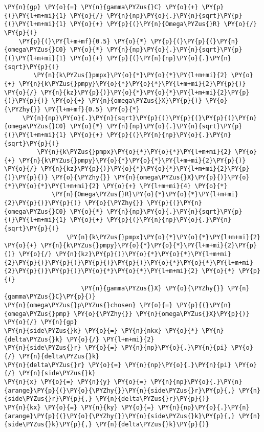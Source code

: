 \begin{Verbatim}[commandchars=\\\{\}]
\PY{n}{gp} \PY{o}{=} \PY{n}{gamma\PYZus{}C} \PY{o}{+} \PY{p}{(}\PY{l+m+mi}{1} \PY{o}{/} \PY{n}{np}\PY{o}{.}\PY{n}{sqrt}\PY{p}{(}\PY{l+m+mi}{1} \PY{o}{+} \PY{p}{(}\PY{n}{Omega\PYZus{}R} \PY{o}{/} \PY{p}{(}
    \PY{p}{(}\PY{l+m+mf}{0.5} \PY{o}{*} \PY{p}{(}\PY{p}{(}\PY{n}{omega\PYZus{}C0} \PY{o}{*} \PY{n}{np}\PY{o}{.}\PY{n}{sqrt}\PY{p}{(}\PY{l+m+mi}{1} \PY{o}{+} \PY{p}{(}\PY{n}{np}\PY{o}{.}\PY{n}{sqrt}\PY{p}{(}
        \PY{n}{k\PYZus{}pmpx}\PY{o}{*}\PY{o}{*}\PY{l+m+mi}{2} \PY{o}{+} \PY{n}{k\PYZus{}pmpy}\PY{o}{*}\PY{o}{*}\PY{l+m+mi}{2}\PY{p}{)} \PY{o}{/} \PY{n}{kz}\PY{p}{)}\PY{o}{*}\PY{o}{*}\PY{l+m+mi}{2}\PY{p}{)}\PY{p}{)} \PY{o}{+} \PY{n}{omega\PYZus{}X}\PY{p}{)} \PY{o}{\PYZhy{}} \PY{l+m+mf}{0.5} \PY{o}{*}
     \PY{n}{np}\PY{o}{.}\PY{n}{sqrt}\PY{p}{(}\PY{p}{(}\PY{p}{(}\PY{n}{omega\PYZus{}C0} \PY{o}{*} \PY{n}{np}\PY{o}{.}\PY{n}{sqrt}\PY{p}{(}\PY{l+m+mi}{1} \PY{o}{+} \PY{p}{(}\PY{n}{np}\PY{o}{.}\PY{n}{sqrt}\PY{p}{(}
         \PY{n}{k\PYZus{}pmpx}\PY{o}{*}\PY{o}{*}\PY{l+m+mi}{2} \PY{o}{+} \PY{n}{k\PYZus{}pmpy}\PY{o}{*}\PY{o}{*}\PY{l+m+mi}{2}\PY{p}{)} \PY{o}{/} \PY{n}{kz}\PY{p}{)}\PY{o}{*}\PY{o}{*}\PY{l+m+mi}{2}\PY{p}{)}\PY{p}{)} \PY{o}{\PYZhy{}} \PY{n}{omega\PYZus{}X}\PY{p}{)}\PY{o}{*}\PY{o}{*}\PY{l+m+mi}{2} \PY{o}{+} \PY{l+m+mi}{4} \PY{o}{*}
             \PY{n}{Omega\PYZus{}R}\PY{o}{*}\PY{o}{*}\PY{l+m+mi}{2}\PY{p}{)}\PY{p}{)} \PY{o}{\PYZhy{}} \PY{p}{(}\PY{n}{omega\PYZus{}C0} \PY{o}{*} \PY{n}{np}\PY{o}{.}\PY{n}{sqrt}\PY{p}{(}\PY{l+m+mi}{1} \PY{o}{+} \PY{p}{(}\PY{n}{np}\PY{o}{.}\PY{n}{sqrt}\PY{p}{(}
                 \PY{n}{k\PYZus{}pmpx}\PY{o}{*}\PY{o}{*}\PY{l+m+mi}{2} \PY{o}{+} \PY{n}{k\PYZus{}pmpy}\PY{o}{*}\PY{o}{*}\PY{l+m+mi}{2}\PY{p}{)} \PY{o}{/} \PY{n}{kz}\PY{p}{)}\PY{o}{*}\PY{o}{*}\PY{l+m+mi}{2}\PY{p}{)}\PY{p}{)}\PY{p}{)}\PY{p}{)}\PY{o}{*}\PY{o}{*}\PY{l+m+mi}{2}\PY{p}{)}\PY{p}{)}\PY{o}{*}\PY{o}{*}\PY{l+m+mi}{2} \PY{o}{*} \PY{p}{(}
                     \PY{n}{gamma\PYZus{}X} \PY{o}{\PYZhy{}} \PY{n}{gamma\PYZus{}C}\PY{p}{)}
\PY{n}{omega\PYZus{}p\PYZus{}chosen} \PY{o}{=} \PY{p}{(}\PY{n}{omega\PYZus{}pmp} \PY{o}{\PYZhy{}} \PY{n}{omega\PYZus{}X}\PY{p}{)} \PY{o}{/} \PY{n}{gp}
\PY{n}{side\PYZus{}k} \PY{o}{=} \PY{n}{nkx} \PY{o}{*} \PY{n}{delta\PYZus{}k} \PY{o}{/} \PY{l+m+mi}{2}
\PY{n}{side\PYZus{}r} \PY{o}{=} \PY{n}{np}\PY{o}{.}\PY{n}{pi} \PY{o}{/} \PY{n}{delta\PYZus{}k}
\PY{n}{delta\PYZus{}r} \PY{o}{=} \PY{n}{np}\PY{o}{.}\PY{n}{pi} \PY{o}{/} \PY{n}{side\PYZus{}k}
\PY{n}{x} \PY{o}{=} \PY{n}{y} \PY{o}{=} \PY{n}{np}\PY{o}{.}\PY{n}{arange}\PY{p}{(}\PY{o}{\PYZhy{}}\PY{n}{side\PYZus{}r}\PY{p}{,} \PY{n}{side\PYZus{}r}\PY{p}{,} \PY{n}{delta\PYZus{}r}\PY{p}{)}
\PY{n}{kx} \PY{o}{=} \PY{n}{ky} \PY{o}{=} \PY{n}{np}\PY{o}{.}\PY{n}{arange}\PY{p}{(}\PY{o}{\PYZhy{}}\PY{n}{side\PYZus{}k}\PY{p}{,} \PY{n}{side\PYZus{}k}\PY{p}{,} \PY{n}{delta\PYZus{}k}\PY{p}{)}

\end{Verbatim}
